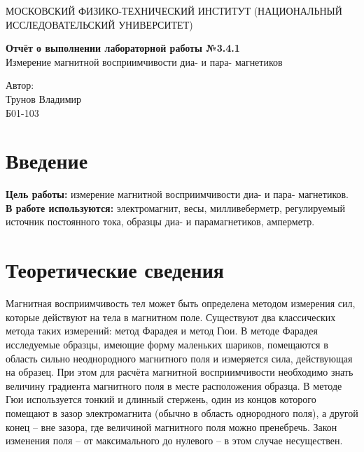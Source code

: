 \documentclass[a4paper,12pt]{article} %
\date{\today}
\begin{document}
\begin{titlepage}
	\begin{center}
		{\large МОСКОВСКИЙ ФИЗИКО-ТЕХНИЧЕСКИЙ ИНСТИТУТ (НАЦИОНАЛЬНЫЙ ИССЛЕДОВАТЕЛЬСКИЙ УНИВЕРСИТЕТ)}
	\end{center}

 
	\vspace{4.5cm}
	{\huge
		\begin{center}
			{\bf Отчёт о выполнении лабораторной работы №3.4.1}\\
			Измерение магнитной восприимчивости диа- и пара- магнетиков
		\end{center}
	}
	\vspace{2cm}
	\begin{flushright}
		{\LARGE Автор:\\ Трунов Владимир \\
			\vspace{0.2cm}
			Б01-103}
	\end{flushright}
	\vspace{8cm}
	
\end{titlepage}

\section{Введение}

\textbf{Цель работы:} измерение магнитной восприимчивости диа- и пара- магнетиков.
\\
\textbf{В работе используются:} электромагнит, весы, милливеберметр, регулируемый источник постоянного тока, образцы диа- и парамагнетиков, амперметр.

\section{Теоретические сведения}

Магнитная восприимчивость тел может быть определена методом измерения сил, которые действуют на тела в магнитном поле. Существуют два классических метода таких измерений: метод Фарадея и метод Гюи. В методе Фарадея исследуемые образцы, имеющие форму маленьких шариков, помещаются в область сильно неоднородного магнитного поля и измеряется сила, действующая на образец. При этом для расчёта магнитной восприимчивости необходимо знать величину градиента магнитного поля в месте расположения образца. В методе Гюи используется тонкий и длинный стержень, один из концов которого помещают в зазор электромагнита (обычно в область однородного поля), а другой конец -- вне зазора, где величиной магнитного поля можно пренебречь. Закон изменения поля -- от максимального до нулевого -- в этом случае несуществен.
\end{document}
